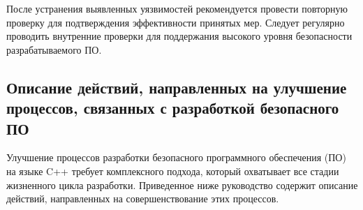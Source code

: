 После устранения выявленных уязвимостей рекомендуется провести повторную проверку для подтверждения эффективности принятых мер. Следует регулярно проводить внутренние проверки для поддержания высокого уровня безопасности разрабатываемого ПО.

\subsection{Описание действий, направленных на улучшение процессов, связанных с разработкой безопасного ПО}

Улучшение процессов разработки безопасного программного обеспечения (ПО) на языке C++ требует комплексного подхода, который охватывает все стадии жизненного цикла разработки. Приведенное ниже руководство содержит описание действий, направленных на совершенствование этих процессов.

